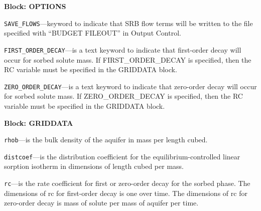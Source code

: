 
\item \textbf{Block: OPTIONS}

\begin{description}
\item \texttt{SAVE\_FLOWS}---keyword to indicate that SRB flow terms will be written to the file specified with ``BUDGET FILEOUT'' in Output Control.

\item \texttt{FIRST\_ORDER\_DECAY}---is a text keyword to indicate that first-order decay will occur for sorbed solute mass.  If FIRST_ORDER_DECAY is specified, then the RC variable must be specified in the GRIDDATA block.

\item \texttt{ZERO\_ORDER\_DECAY}---is a text keyword to indicate that zero-order decay will occur for sorbed solute mass. If ZERO_ORDER_DECAY is specified, then the RC variable must be specified in the GRIDDATA block.

\end{description}
\item \textbf{Block: GRIDDATA}

\begin{description}
\item \texttt{rhob}---is the bulk density of the aquifer in mass per length cubed.

\item \texttt{distcoef}---is the distribution coefficient for the equilibrium-controlled linear sorption isotherm in dimensions of length cubed per mass.

\item \texttt{rc}---is the rate coefficient for first or zero-order decay for the sorbed phase.  The dimensions of rc for first-order decay is one over time.  The dimensions of rc for zero-order decay is mass of solute per mass of aquifer per time.

\end{description}


